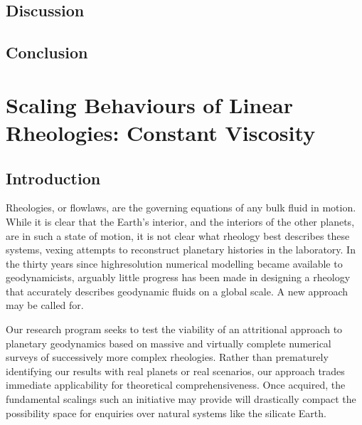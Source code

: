 \documentclass[letterpaper,10pt,english]{jupyterBook}
\begin{document}
\section{Discussion}
\label{\detokenize{content/chapter_03_everest/discussion:discussion}}\label{\detokenize{content/chapter_03_everest/discussion::doc}}

\section{Conclusion}
\label{\detokenize{content/chapter_03_everest/conclusion:conclusion}}\label{\detokenize{content/chapter_03_everest/conclusion::doc}}

\chapter{Scaling Behaviours of Linear Rheologies: Constant Viscosity}
\label{\detokenize{content/chapter_04_isoviscous/abstract:scaling-behaviours-of-linear-rheologies-constant-viscosity}}\label{\detokenize{content/chapter_04_isoviscous/abstract::doc}}

\section{Introduction}
\label{\detokenize{content/chapter_04_isoviscous/introduction:introduction}}\label{\detokenize{content/chapter_04_isoviscous/introduction::doc}}
\sphinxAtStartPar
Rheologies, or flow\sphinxhyphen{}laws, are the governing equations of any bulk fluid in motion. While it is clear that the Earth’s interior, and the interiors of the other planets, are in such a state of motion, it is not clear what rheology best describes these systems, vexing attempts to reconstruct planetary histories in the laboratory. In the thirty years since high\sphinxhyphen{}resolution numerical modelling became available to geodynamicists, arguably little progress has been made in designing a rheology that accurately describes geodynamic fluids on a global scale. A new approach may be called for.

\sphinxAtStartPar
Our research program seeks to test the viability of an attritional approach to planetary geodynamics based on massive and virtually complete numerical surveys of successively more complex rheologies. Rather than prematurely identifying our results with real planets or real scenarios, our approach trades immediate applicability for theoretical comprehensiveness. Once acquired, the fundamental scalings such an initiative may provide will drastically compact the possibility space for enquiries over natural systems like the silicate Earth.
\end{document}
